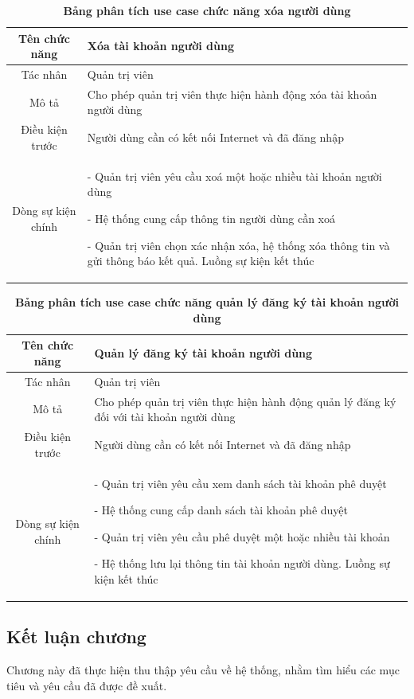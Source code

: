   \begin{table}[H]
    \caption{\bfseries \fontsize{12pt}{0pt}\selectfont Bảng phân tích use case chức năng xóa người dùng}
    \centering
    \begin{tabularx}{0.9\textwidth}{|c|X|}
      \hline
      \textbf{Tên chức năng} & \textbf{Xóa tài khoản người dùng} \\
      \hline
      Tác nhân & Quản trị viên \\
      \hline
      Mô tả & Cho phép quản trị viên thực hiện hành động xóa tài khoản người dùng \\
      \hline
      Điều kiện trước & Người dùng cần có kết nối Internet và đã đăng nhập \\
      \hline
      Dòng sự kiện chính & 
        - Quản trị viên yêu cầu xoá một hoặc nhiều tài khoản người dùng

        - Hệ thống cung cấp thông tin người dùng cần xoá

        - Quản trị viên chọn xác nhận xóa, hệ thống xóa thông tin và gửi thông báo kết quả. Luồng sự kiện kết thúc
        \\
      \hline
    \end{tabularx}
  \end{table}

  \begin{table}[H]
    \caption{\bfseries \fontsize{12pt}{0pt}\selectfont Bảng phân tích use case chức năng quản lý đăng ký tài khoản người dùng}
    \centering
    \begin{tabularx}{0.9\textwidth}{|c|X|}
      \hline
      \textbf{Tên chức năng} & \textbf{Quản lý đăng ký tài khoản người dùng} \\
      \hline
      Tác nhân & Quản trị viên \\
      \hline
      Mô tả & Cho phép quản trị viên thực hiện hành động quản lý đăng ký đối với tài khoản người dùng \\
      \hline
      Điều kiện trước & Người dùng cần có kết nối Internet và đã đăng nhập \\
      \hline
      Dòng sự kiện chính & 
        - Quản trị viên yêu cầu xem danh sách tài khoản phê duyệt

        - Hệ thống cung cấp danh sách tài khoản phê duyệt

        - Quản trị viên yêu cầu phê duyệt một hoặc nhiều tài khoản

        - Hệ thống lưu lại thông tin tài khoản người dùng. Luồng sự kiện kết thúc        
        \\
      \hline
    \end{tabularx}
  \end{table}

\subsection{Kết luận chương}

Chương này đã thực hiện thu thập yêu cầu về
 hệ thống, nhằm tìm hiểu các mục tiêu và yêu cầu đã được đề xuất.

\newpage
